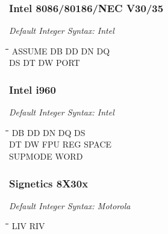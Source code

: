 \subsubsection{Intel 8086/80186/NEC V30/35}

{\em Default Integer Syntax: Intel}

{\tt\begin{tabbing}
\hspace{3cm}\=\hspace{3cm}\=\hspace{3cm}\=\hspace{3cm}\=\kill
ASSUME     \> DB          \> DD          \> DN          \> DQ \\
DS         \> DT          \> DW          \> PORT \\
\end{tabbing}}

\subsubsection{Intel i960}

{\em Default Integer Syntax: Intel}

{\tt\begin{tabbing}
\hspace{3cm}\=\hspace{3cm}\=\hspace{3cm}\=\hspace{3cm}\=\kill    
DB         \> DD          \> DN          \> DQ          \> DS \\
DT         \> DW          \> FPU         \> REG         \> SPACE \\
SUPMODE    \> WORD \\
\end{tabbing}}

\subsubsection{Signetics 8X30x}

{\em Default Integer Syntax: Motorola}

{\tt\begin{tabbing}
\hspace{3cm}\=\hspace{3cm}\=\hspace{3cm}\=\hspace{3cm}\=\kill
LIV        \> RIV         \\   
\end{tabbing}}

